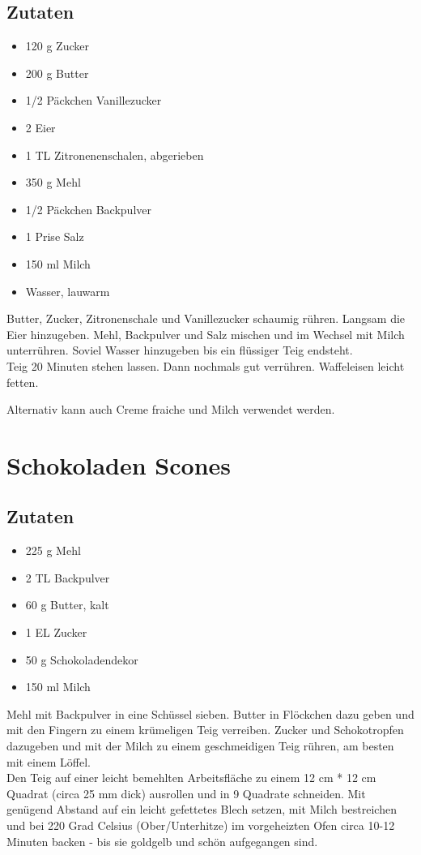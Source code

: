 \documentclass{article}
\begin{document}
\subsection*{Zutaten} %
\label{sub:zutaten}
	\begin{itemize}
		\item 120 g Zucker
		\item 200 g Butter
		\item 1/2 Päckchen Vanillezucker
		\item 2 Eier
		\item 1 TL Zitronenenschalen, abgerieben
		\item 350 g Mehl
		\item 1/2 Päckchen Backpulver
		\item 1 Prise Salz
		\item 150 ml Milch
		\item Wasser, lauwarm
	\end{itemize}
	Butter, Zucker, Zitronenschale und Vanillezucker schaumig rühren.
	Langsam die Eier hinzugeben. Mehl, Backpulver und Salz mischen und im Wechsel mit Milch 
	unterrühren. Soviel Wasser hinzugeben bis ein flüssiger Teig endsteht.\\
	Teig 20 Minuten stehen lassen. Dann nochmals gut verrühren. Waffeleisen leicht fetten.

	Alternativ kann auch Creme fraiche und Milch verwendet werden.

\newpage
\section{Schokoladen Scones} %
\label{sec:schokoladen_scones}
\subsection*{Zutaten} %
\label{sub:zutaten}
	\begin{itemize}
		\item 225 g Mehl
		\item 2 TL Backpulver
		\item 60 g Butter, kalt
		\item 1 EL Zucker
		\item 50 g Schokoladendekor
		\item 150 ml Milch
	\end{itemize}

	Mehl mit Backpulver in eine Schüssel sieben.
	Butter in Flöckchen dazu geben und mit den Fingern zu einem krümeligen Teig verreiben.
	Zucker und Schokotropfen dazugeben und mit der Milch zu einem geschmeidigen Teig rühren,
	am besten mit einem Löffel.\\
	Den Teig auf einer leicht bemehlten Arbeitsfläche
	zu einem 12 cm * 12 cm Quadrat (circa 25 mm dick) ausrollen
	und in 9 Quadrate schneiden.
	Mit genügend Abstand auf ein leicht gefettetes Blech setzen,
	mit Milch bestreichen
	und bei 220 Grad Celsius (Ober/Unterhitze) im vorgeheizten Ofen circa 10-12 Minuten backen 
	- bis sie goldgelb und schön aufgegangen sind.
\end{document}
